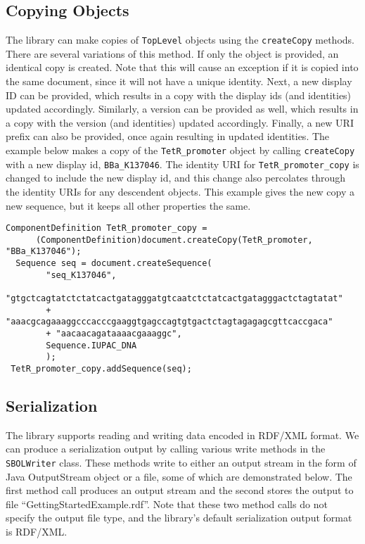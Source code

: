 \subsection*{Copying Objects}
The library can make copies of \lstinline+TopLevel+ objects using the \lstinline+createCopy+ methods.  There are several variations of this method.  If only the object is provided, an identical copy is created.  Note that this will cause an exception if it is copied into the same document, since it will not have a unique identity.  Next, a new display ID can be provided, which results in a copy with the display ids (and identities) updated accordingly.  Similarly, a version can be provided as well, which results in a copy with the version (and identities) updated accordingly.  Finally, a new URI prefix can also be provided, once again resulting in updated identities.  The example below makes a copy of the
\lstinline+TetR_promoter+ object by calling \lstinline+createCopy+ with a new display id, \lstinline+BBa_K137046+. The identity URI for \lstinline+TetR_promoter_copy+ is changed to include the new display id, and this change also percolates through the identity URIs for any descendent objects.  This example gives the new copy a new sequence, but it keeps all other properties the same. 

\begin{minipage}{0.95\textwidth} 
\begin{lstlisting}[basicstyle=\footnotesize\ttfamily]
  ComponentDefinition TetR_promoter_copy = 
      (ComponentDefinition)document.createCopy(TetR_promoter, "BBa_K137046");
  Sequence seq = document.createSequence(
 		"seq_K137046",
		"gtgctcagtatctctatcactgatagggatgtcaatctctatcactgatagggactctagtatat"
		+ "aaacgcagaaaggcccacccgaaggtgagccagtgtgactctagtagagagcgttcaccgaca"
		+ "aacaacagataaaacgaaaggc",
		Sequence.IUPAC_DNA
		);	
 TetR_promoter_copy.addSequence(seq);
\end{lstlisting}
\end{minipage}

\subsection*{Serialization}
The library supports reading and writing data encoded in RDF/XML
format. We can produce a serialization output by
calling various write methods in the \lstinline+SBOLWriter+
class. These methods write to either an output stream in the form of
Java OutputStream object or a file, some
of which are demonstrated below. The first method call produces an output
stream and the second stores the output to file
``GettingStartedExample.rdf''. Note that these two method calls do not
specify the output file type, and the library's default serialization
output format is RDF/XML. %

